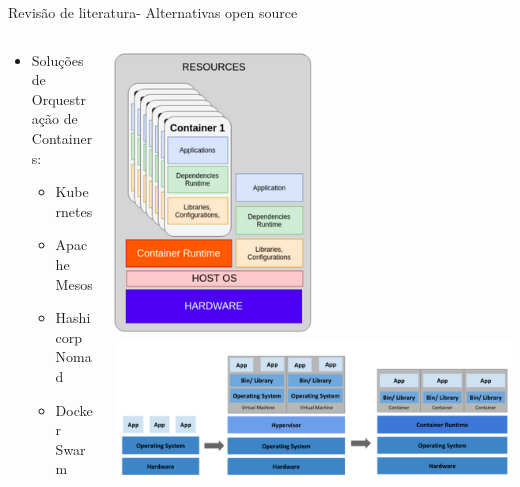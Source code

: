 \documentclass[10pt,brazil]{beamer}
\theoremstyle{definition}
\begin{document}
\begin{frame}{Revisão de literatura- Alternativas open source}
  \begin{columns}
    \begin{column}{0.5\textwidth}
      \begin{itemize}
        \item Soluções de Orquestração de Containers:
              \begin{itemize}
                \item Kubernetes\textregistered
                \item Apache Mesos\textregistered
                \item Hashicorp Nomad\textregistered\*
                \item Docker Swarm\textregistered
              \end{itemize}
      \end{itemize}
    \end{column}
    \begin{column}{0.5\textwidth}  %
      \begin{center}
        \includegraphics[width=0.5\textwidth]{containers.png}
        \includegraphics[width=1\textwidth]{vmsContainer.png}
      \end{center}
    \end{column}
  \end{columns}
\end{frame}
\end{document}
